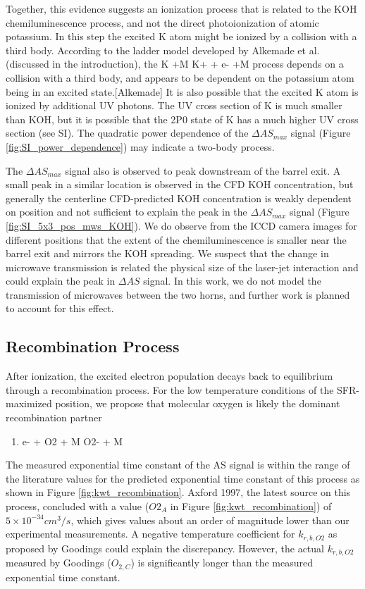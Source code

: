 Together, this evidence suggests an ionization process that is related to the KOH chemiluminescence process, and not the direct photoionization of atomic potassium. In this step the excited K atom might be ionized by a collision with a third body. According to the ladder model developed by Alkemade et al. (discussed in the introduction), the K +M \rightarrow K+ + e- +M process depends on a collision with a third body, and appears to be dependent on the potassium atom being in an excited state.[Alkemade] It is also possible that the excited K atom is ionized by additional UV photons. The UV cross section of K is much smaller than KOH, but it is possible that the 2P0 state of K has a much higher UV cross section (see SI). The quadratic power dependence of the $\Delta AS_{max}$ signal (Figure \ref*{fig:SI_power_dependence}) may indicate a two-body process. 

The $\Delta AS_{max}$ signal also is observed to peak downstream of the barrel exit. A small peak in a similar location is observed in the CFD KOH concentration, but generally the centerline CFD-predicted KOH concentration is weakly dependent on position and not sufficient to explain the peak in the $\Delta AS_{max}$ signal (Figure \ref*{fig:SI_5x3_pos_mws_KOH}). We do observe from the ICCD camera images for different positions that the extent of the chemiluminescence is smaller near the barrel exit and mirrors the KOH spreading. We suspect that the change in microwave transmission is related the physical size of the laser-jet interaction and could explain the peak in $\Delta AS$ signal. In this work, we do not model the transmission of microwaves between the two horns, and further work is planned to account for this effect.

\subsection{Recombination Process}

After ionization, the excited electron population decays back to equilibrium through a recombination process. For the low temperature conditions of the SFR-maximized position, we propose that molecular oxygen is likely the dominant recombination partner

\begin{enumerate}
\item e- + O2 + M \rightarrow O2- + M 
\end{enumerate}

The measured exponential time constant of the AS signal is within the range of the literature values for the predicted exponential time constant of this process as shown in Figure \ref{fig:kwt_recombination}. Axford 1997, the latest source on this process, concluded with a value ($O2_A$ in Figure \ref{fig:kwt_recombination}) of $5 \times 10^{-34} cm^3/s$, which gives values about an order of magnitude lower than our experimental measurements. A negative temperature coefficient for $k_{r,b,O2}$ as proposed by Goodings could explain the discrepancy. However, the actual $k_{r,b,O2}$ measured by Goodings ($O_{2,C}$) is significantly longer than the measured exponential time constant. 

